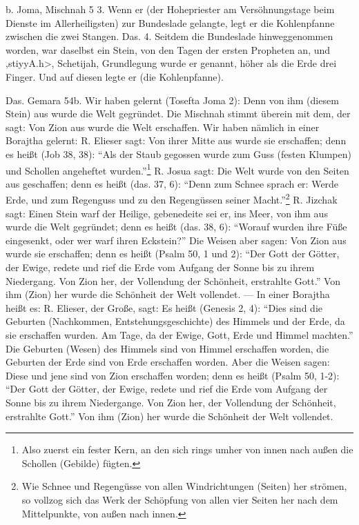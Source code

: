 \documentclass[a4paper, 11pt, oneside]{article}
\begin{document}
b. Joma, Mischnah 5 3. Wenn er (der Hohepriester am Versöhnungstage beim Dienste im Allerheiligsten) zur Bundeslade gelangte, legt er die Kohlenpfanne zwischen die zwei Stangen. Das. 4. Seitdem die Bundeslade hinweggenommen worden, war daselbst ein Stein, von den Tagen der ersten Propheten an, und \<,stiyyA.h>, Schetijah, Grundlegung wurde er genannt, höher als die Erde drei Finger. Und auf diesen legte er (die Kohlenpfanne).

Das. Gemara 54b. Wir haben gelernt (Tosefta Joma 2): Denn von ihm (diesem Stein) aus wurde die Welt gegründet. Die Mischnah stimmt überein mit dem, der sagt: Von Zion aus wurde die Welt erschaffen. Wir haben nämlich in einer Borajtha gelernt: R. Elieser sagt: Von ihrer Mitte aus wurde sie erschaffen; denn es heißt (Job 38, 38): "`Als der Staub gegossen wurde zum Guss (festen Klumpen) und Schollen angeheftet wurden."'\footnote{Also zuerst ein fester Kern, an den sich rings umher von innen nach außen die Schollen (Gebilde) fügten.} R. Josua sagt: Die Welt wurde von den Seiten aus geschaffen; denn es heißt (das. 37, 6): "`Denn zum Schnee sprach er: Werde Erde, und zum Regenguss und zu den Regengüssen seiner Macht."'\footnote{Wie Schnee und Regengüsse von allen Windrichtungen (Seiten) her strömen, so vollzog sich das Werk der Schöpfung von allen vier Seiten her nach dem Mittelpunkte, von außen nach innen.} R. Jizchak sagt: Einen Stein warf der Heilige, gebenedeite sei er, ins Meer, von ihm aus wurde die Welt gegründet; denn es heißt (das. 38, 6): "`Worauf wurden ihre Füße eingesenkt, oder wer warf ihren Eckstein?"' Die Weisen aber sagen: Von Zion aus wurde sie erschaffen; denn es heißt (Psalm 50, 1 und 2): "`Der Gott der Götter, der Ewige, redete und rief die Erde vom Aufgang der Sonne bis zu ihrem Niedergang. Von Zion her, der Vollendung der Schönheit, erstrahlte Gott."' Von ihm (Zion) her wurde die Schönheit der Welt vollendet. --- In einer Borajtha heißt es: R. Elieser, der Große, sagt: Es heißt (Genesis 2, 4): "`Dies sind die Geburten (Nachkommen, Entstehungsgeschichte) des Himmels und der Erde, da sie erschaffen wurden. Am Tage, da der Ewige, Gott, Erde und Himmel machten."' Die Geburten (Wesen) des Himmels sind von Himmel erschaffen worden, die Geburten der Erde sind von Erde erschaffen worden. Aber die Weisen sagen: Diese und jene sind von Zion erschaffen worden; denn es heißt (Psalm 50, 1-2): "`Der Gott der Götter, der Ewige, redete und rief die Erde vom Aufgang der Sonne bis zu ihrem Niedergange. Von Zion her, der Vollendung der Schönheit, erstrahlte Gott."' Von ihm (Zion) her wurde die Schönheit der Welt vollendet.
\end{document}
